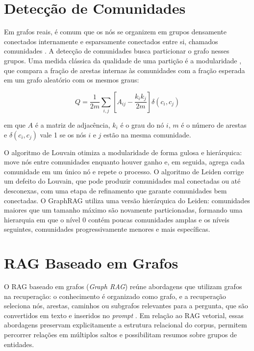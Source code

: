 \section{Detecção de Comunidades}
\label{sec-referencial-comunidades}

Em grafos reais, é comum que os nós se organizem em grupos densamente conectados internamente e esparsamente conectados entre si, chamados comunidades \cite{fortunato2010community}. A detecção de comunidades busca particionar o grafo nesses grupos. Uma medida clássica da qualidade de uma partição é a modularidade \cite{newman2006modularity}, que compara a fração de arestas internas às comunidades com a fração esperada em um grafo aleatório com os mesmos graus:

\begin{equation}
\label{eq-modularidade}
Q = \frac{1}{2m} \sum_{i,j} \left[ A_{ij} - \frac{k_i k_j}{2m} \right] \delta(c_i, c_j)
\end{equation}

\noindent em que $A$ é a matriz de adjacência, $k_i$ é o grau do nó $i$, $m$ é o número de arestas e $\delta(c_i, c_j)$ vale 1 se os nós $i$ e $j$ estão na mesma comunidade.

O algoritmo de Louvain \cite{blondel2008fast} otimiza a modularidade de forma gulosa e hierárquica: move nós entre comunidades enquanto houver ganho e, em seguida, agrega cada comunidade em um único nó e repete o processo. O algoritmo de Leiden \cite{traag2019louvain} corrige um defeito do Louvain, que pode produzir comunidades mal conectadas ou até desconexas, com uma etapa de refinamento que garante comunidades bem conectadas. O GraphRAG utiliza uma versão hierárquica do Leiden: comunidades maiores que um tamanho máximo são novamente particionadas, formando uma hierarquia em que o nível 0 contém poucas comunidades amplas e os níveis seguintes, comunidades progressivamente menores e mais específicas.

\section{RAG Baseado em Grafos}
\label{sec-referencial-graphrag}

O RAG baseado em grafos (\textit{Graph RAG}) reúne abordagens que utilizam grafos na recuperação: o conhecimento é organizado como grafo, e a recuperação seleciona nós, arestas, caminhos ou subgrafos relevantes para a pergunta, que são convertidos em texto e inseridos no \textit{prompt} \cite{peng2024graph}. Em relação ao RAG vetorial, essas abordagens preservam explicitamente a estrutura relacional do corpus, permitem percorrer relações em múltiplos saltos e possibilitam resumos sobre grupos de entidades.

